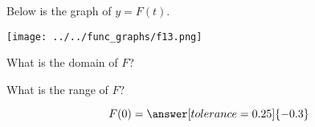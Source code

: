\documentclass{ximera}
\author{Lee Wayand}
\begin{document}
\begin{exercise}  





Below is the graph of $y=F(t)$.  

\begin{image}
\texttt{[image: ../../func\_graphs/f13.png]}
\end{image}









\begin{question} 


What is the domain of $F$?\\


\begin{multipleChoice}
\choice {$(-\infty, \infty)$}
\choice {$[-9.9]$}
\end{multipleChoice}

\end{question}






\begin{question} 


What is the range of $F$?\\


\begin{multipleChoice}
\choice {$(-\infty, \infty)$}
\choice {$[-10.10]$}
\end{multipleChoice}


\end{question}









\begin{question} 



\[  F(0) = \answer[tolerance=0.25]{-0.3}  \]

\end{question}







\begin{question} 



\end{question}
\end{exercise}
\end{document}
